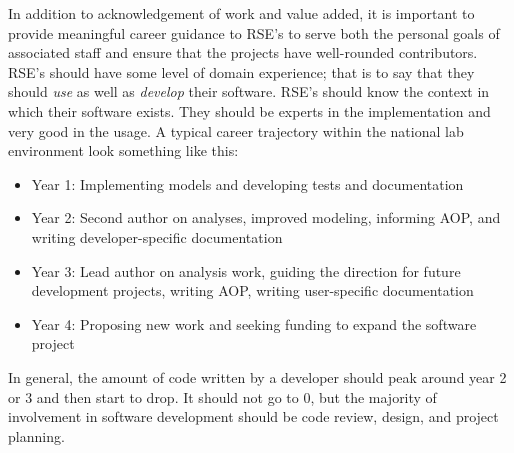 \documentclass[]{nrel}
\begin{document}
\begin{appendices}
\begin{itemize}
\end{itemize}

In addition to acknowledgement of work and value added, it is important to provide meaningful
career guidance to RSE’s to serve both the personal goals of associated staff and ensure
that the projects have well-rounded contributors. RSE’s should have some level of domain
experience; that is to say that they should \textit{use} as well as \textit{develop} their software.
RSE’s should know the context in which their software exists.
They should be experts in the implementation and very good in the usage.
A typical career trajectory within the national lab environment look something like this:
\begin{itemize}
\item Year 1: Implementing models and developing tests and documentation

\item Year 2: Second author on analyses, improved modeling, informing AOP, and writing developer-specific documentation

\item Year 3: Lead author on analysis work, guiding the direction for future development projects, writing AOP, writing user-specific documentation

\item Year 4: Proposing new work and seeking funding to expand the software project

\end{itemize}

In general, the amount of code written by a developer should peak around year 2 or 3 and
then start to drop.
It should not go to 0, but the majority of involvement in software development should be code
review, design, and project planning.



\end{appendices}
\end{document}
